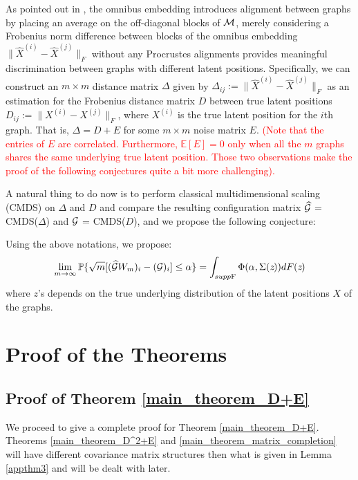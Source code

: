 As pointed out in \cite{OMNI}, the omnibus embedding introduces alignment between graphs by placing an average on the off-diagonal blocks of ${\mathcal{M}}$, merely considering a Frobenius norm difference between blocks of the omnibus embedding 
$\| \hat{X}^{(i)} - \hat{X}^{(j)} \|_{F}$
without any Procrustes alignments provides meaningful discrimination between graphs with different latent positions. Specifically, we can construct an $m \times m$ distance matrix $\Delta$ given by $\Delta_{ij} := \| \hat{X}^{(i)} - \hat{X}^{(j)} \|_{F}$ as an estimation for the Frobenius distance matrix $D$ between true latent positions $ D_{ij} := \| X^{(i)} - X^{(j)} \|_{F}$, where $X^{(i)}$ is the true latent position for the $i$th graph. That is, $\Delta = D + E $ for some $m \times m$ noise matrix $E$. \textcolor{red}{(Note that the entries of $E$ are correlated. Furthermore, $\mathbb{E}[E] = 0$ only when all the $m$ graphs shares the same underlying true latent position. Those two observations make the proof of the following conjectures quite a bit more challenging).}

A natural thing to do now is to perform classical multidimensional scaling (CMDS) on $\Delta$ and $D$ and compare the resulting configuration matrix $\widehat{{\mathcal{G}}}$ = CMDS($\Delta$) and ${\mathcal{G}}$ = CMDS($D$), and we propose the following conjecture:
\begin{Conjecture}
Using the above notations, we propose:
$$ \lim_{m {\to} \infty} \mathbb{P} \{\sqrt{m} [(\widehat{{\mathcal{G}}}W_m)_i - ({\mathcal{G}})_i ]\leq \alpha\} = \int_{supp \textrm{F}} \Phi(\alpha, \Sigma(\emph{z})) dF(\emph{z}) $$ where $z$'s depends on the true underlying distribution of the latent positions $X$ of the graphs.
\end{Conjecture}









\section{Proof of the Theorems}

\subsection{Proof of Theorem \ref{main_theorem_D+E}}
\label{proof}
We proceed to give a complete proof for Theorem \ref{main_theorem_D+E}. Theorems \ref{main_theorem_D^2+E} and \ref{main_theorem_matrix_completion} will have different covariance matrix structures then what is given in Lemma \ref{appthm3} and will be dealt with later.

